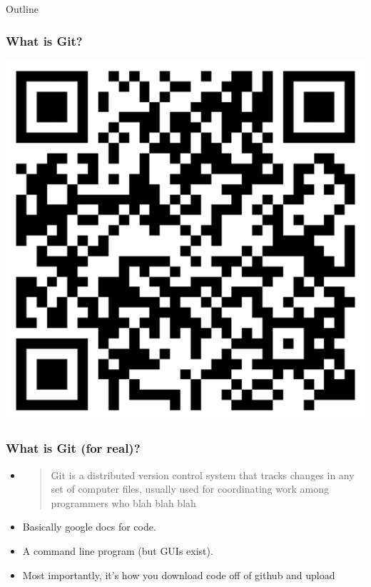 \documentclass[aspectratio=169,hyperref={unicode}]{beamer}
\begin{document}
\begin{frame}{Outline}
\tableofcontents[currentsection]
\end{frame}

\begin{frame}
\frametitle{What is Git?}

\includegraphics[scale=0.3]{image.png}

\end{frame}

\begin{frame}
\frametitle{What is Git (for real)?}
\begin{itemize}
\item

\begin{quote}
Git  is a distributed version control system that tracks changes in any set of computer files, usually used for coordinating work among programmers who blah blah blah
\end{quote}
\item Basically google docs for code.
\item A command line program (but GUIs exist).
\item Most importantly, it's how you download code off of github and upload
\end{itemize}
\end{frame}
\end{document}
